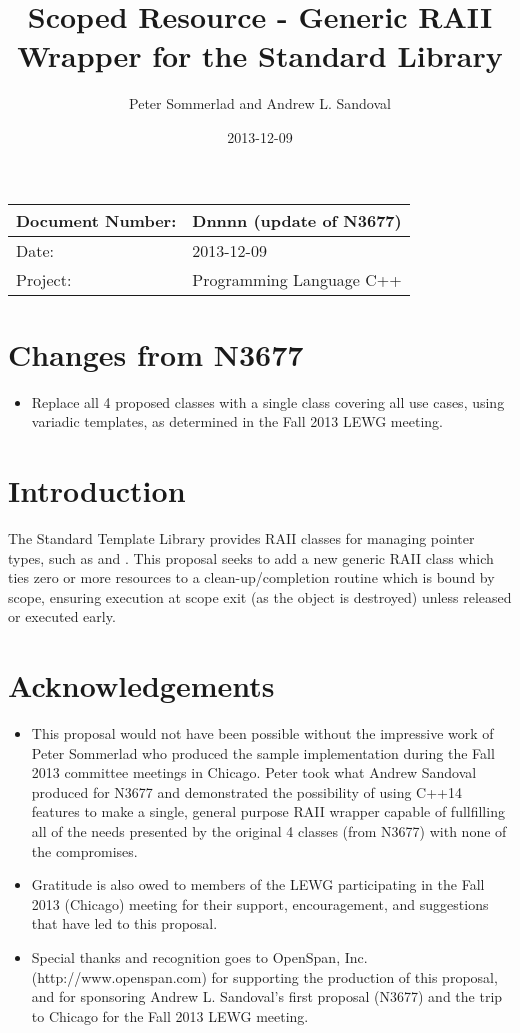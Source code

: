 \documentclass[ebook,11pt,article]{memoir}
\title{Scoped Resource - Generic RAII Wrapper for the Standard Library}
\author{Peter Sommerlad and Andrew L. Sandoval}
\date{2013-12-09}                                           %
\begin{document}
\maketitle
\begin{tabular}[t]{|l|l|}\hline 
Document Number: &  Dnnnn (update of N3677)\\\hline
Date: & 2013-12-09 \\\hline
Project: & Programming Language C++\\\hline 
\end{tabular}

\chapter{Changes from N3677}
\begin{itemize}
\item Replace all 4 proposed classes with a single class covering all use cases, using variadic templates, as determined in the Fall 2013 LEWG meeting.
\end{itemize}

\chapter{Introduction}
The Standard Template Library provides RAII classes for managing pointer types, such as  and .  This proposal seeks to add a new generic RAII class which ties zero or more resources to a clean-up/completion routine which is bound by scope, ensuring execution at scope exit (as the object is destroyed) unless released or executed early.

\chapter{Acknowledgements}
\begin{itemize}
\item This proposal would not have been possible without the impressive work of Peter Sommerlad who produced the sample implementation during the Fall 2013 committee meetings in Chicago.  Peter took what Andrew Sandoval produced for N3677 and demonstrated the possibility of using C++14 features to make a single, general purpose RAII wrapper capable of fullfilling all of the needs presented by the original 4 classes (from N3677) with none of the compromises.
\item Gratitude is also owed to members of the LEWG participating in the Fall 2013 (Chicago) meeting for their support, encouragement, and suggestions that have led to this proposal.
\item Special thanks and recognition goes to OpenSpan, Inc. (http://www.openspan.com) for supporting the production of this proposal, and for sponsoring Andrew L. Sandoval's first proposal (N3677) and the trip to Chicago for the Fall 2013 LEWG meeting.
\end{itemize}
\end{document}
